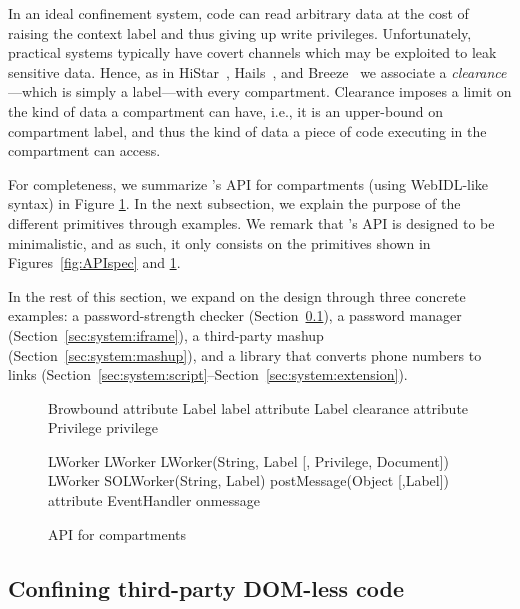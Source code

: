 In an ideal confinement system, code can read arbitrary data at the
cost of raising the context label and thus giving up write privileges.
%
Unfortunately, practical systems typically have covert channels which
may be exploited to leak sensitive data.
%
Hence, as in HiStar~\cite{Zeldovich:2006}, Hails~\cite{giffin:2012:hails}, and
Breeze~\cite{Breeze13} we associate a \emph{clearance}---which is
simply a label---with every compartment.
%
Clearance imposes a limit on the kind of data a compartment can have,
i.e., it is an upper-bound on compartment label, and thus the kind of
data a piece of code executing in the compartment can access.

For completeness, we summarize  \sys{}'s API for compartments
(using WebIDL-like syntax) in Figure \ref{systemAPI}. In the next subsection, 
we explain the purpose of the different primitives through examples. 
We remark that \sys{}'s API is designed to be minimalistic, and as such, it only
consists on the primitives shown in Figures~\ref{fig:APIspec} and
\ref{systemAPI}.

In the rest of this section, we expand on the \sys{} design through
three concrete examples: 
a password-strength checker (Section~\ref{sec:system:worker}),
a password manager (Section~\ref{sec:system:iframe}), 
a third-party mashup (Section~\ref{sec:system:mashup}), and
a library that converts phone numbers to links
(Section~\ref{sec:system:script}--Section~\ref{sec:system:extension}).
%


\begin{figure}
{\small
\begin{webidl}
Browbound {
  attribute Label label
  attribute Label clearance 
  attribute Privilege privilege
}
\end{webidl}
\begin{webidl}
LWorker {
  LWorker LWorker(String, Label
                  [, Privilege, Document])
  LWorker SOLWorker(String, Label)
  postMessage(Object [,Label])
  attribute EventHandler onmessage
}
\end{webidl}
}
\vspace{-10pt}
\caption{\label{systemAPI} API for compartments}
\vspace{-10pt}
\end{figure}


\subsection{Confining third-party DOM-less code}
\label{sec:system:worker}

